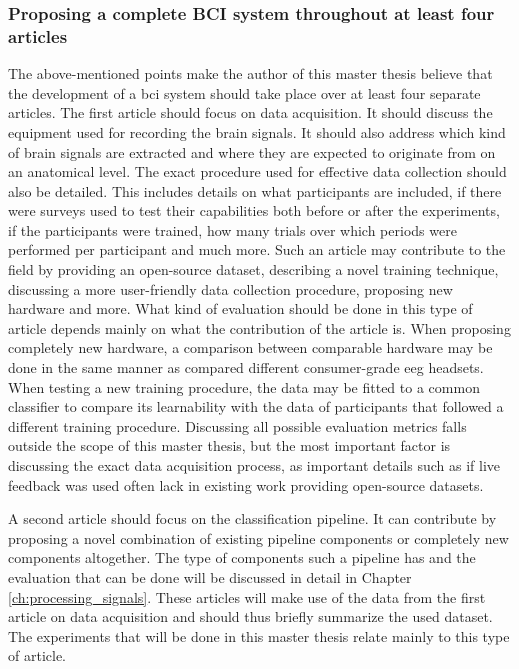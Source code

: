 
\subsubsection{Proposing a complete BCI system throughout at least four articles}
\label{subsubsec:bci_opportunities_obstacles_lack_of_testing_four_articles}

The above-mentioned points make the author of this master thesis believe that the development of a \gls{bci} system should take place over at least four separate articles.
The first article should focus on data acquisition.
It should discuss the equipment used for recording the brain signals.
It should also address which kind of brain signals are extracted and where they are expected to originate from on an anatomical level.
The exact procedure used for effective data collection should also be detailed.
This includes details on what participants are included, if there were surveys used to test their capabilities both before or after the experiments, if the participants were trained, how many trials over which periods were performed per participant and much more. 
Such an article may contribute to the field by providing an open-source dataset, describing a novel training technique, discussing a more user-friendly data collection procedure, proposing new hardware and more.
What kind of evaluation should be done in this type of article depends mainly on what the contribution of the article is.
When proposing completely new hardware, a comparison between comparable hardware may be done in the same manner as \citet{compare_eeg_devices_for_ssvep} compared different consumer-grade \gls{eeg} headsets.
When testing a new training procedure, the data may be fitted to a common classifier to compare its learnability with the data of participants that followed a different training procedure. 
Discussing all possible evaluation metrics falls outside the scope of this master thesis, but the most important factor is discussing the exact data acquisition process, as important details such as if live feedback was used often lack in existing work providing open-source datasets.

A second article should focus on the classification pipeline.
It can contribute by proposing a novel combination of existing pipeline components or completely new components altogether.
The type of components such a pipeline has and the evaluation that can be done will be discussed in detail in Chapter \ref{ch:processing_signals}.
These articles will make use of the data from the first article on data acquisition and should thus briefly summarize the used dataset.
The experiments that will be done in this master thesis relate mainly to this type of article.

